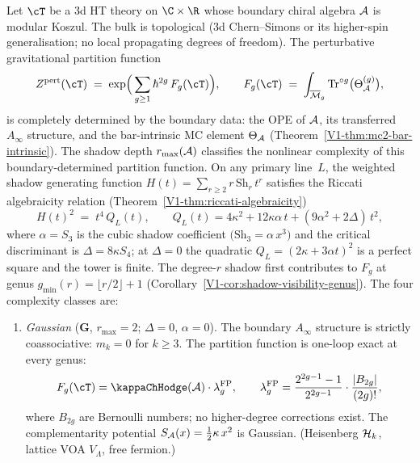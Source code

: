 \begin{theorem}
\label{thm:thqg-boundary-holographic-complexity}
\ClaimStatusProvedHere
{}
Let $\cT$ be a $3$d HT theory on $\C \times \R$ whose boundary
chiral algebra $\mathcal{A}$ is modular Koszul.
The bulk is topological \textup{(}$3$d Chern--Simons or its
higher-spin generalisation; no local propagating degrees of
freedom\textup{)}. The perturbative gravitational partition
function
\begin{equation}\label{eq:boundary-holographic-Z}
 Z^{\mathrm{pert}}(\cT)
 \;=\;
 \exp\Bigl(\,\sum_{g \geq 1} \hbar^{2g}\,F_g(\cT)\Bigr),
 \qquad
 F_g(\cT)
 \;=\;
 \int_{\overline{\cM}_g}
 \operatorname{Tr}^{\circ g}\bigl(\Theta_\cA^{(g)}\bigr),
\end{equation}
is completely determined by the boundary data: the OPE of
$\mathcal{A}$, its transferred $A_\infty$ structure, and the
bar-intrinsic MC element $\Theta_{\mathcal{A}}$
\textup{(}Theorem~\textup{\ref*{V1-thm:mc2-bar-intrinsic}}\textup{)}.
The shadow depth $r_{\max}(\mathcal{A})$ classifies the nonlinear
complexity of this boundary-determined partition function.
On any primary line~$L$, the weighted shadow generating function
$H(t) = \sum_{r \geq 2} r\,\mathrm{Sh}_r\,t^r$ satisfies
the Riccati algebraicity relation
\textup{(}Theorem~\textup{\ref*{V1-thm:riccati-algebraicity}}\textup{)}
\begin{equation}\label{eq:boundary-holographic-riccati}
 H(t)^2 \;=\; t^4\,Q_L(t),
 \qquad
 Q_L(t) = 4\kappa^2 + 12\kappa\alpha\,t
 + (9\alpha^2 + 2\Delta)\,t^2,
\end{equation}
where $\alpha = S_3$ is the cubic shadow coefficient
$\bigl(\mathrm{Sh}_3 = \alpha\,x^3\bigr)$ and the critical
discriminant is $\Delta = 8\kappa S_4$; at $\Delta = 0$ the
quadratic $Q_L = (2\kappa + 3\alpha t)^2$ is a perfect square and
the tower is finite.
The degree-$r$ shadow first contributes to $F_g$ at genus
$g_{\min}(r) = \lfloor r/2 \rfloor + 1$
\textup{(}Corollary~\textup{\ref{V1-cor:shadow-visibility-genus}}\textup{)}.
The four complexity classes are:
\begin{enumerate}[label=\textup{(\roman*)}]
\item \emph{Gaussian} ($\mathbf{G}$, $r_{\max} = 2$;
 $\Delta = 0$, $\alpha = 0$).
 The boundary $A_\infty$ structure is strictly
 coassociative: $m_k = 0$ for $k \geq 3$.
 The partition function is one-loop exact at every genus:
 \[
 F_g(\cT) = \kappaChHodge(\cA)\cdot\lambda_g^{\mathrm{FP}},
 \qquad
 \lambda_g^{\mathrm{FP}} =
 \frac{2^{2g-1}-1}{2^{2g-1}}\cdot
 \frac{|B_{2g}|}{(2g)!},
 \]
 where $B_{2g}$ are Bernoulli numbers; no higher-degree
 corrections exist. The complementarity potential
 $S_{\mathcal{A}}(x) = \tfrac{1}{2}\kappa\,x^2$ is Gaussian.
 \textup{(}Heisenberg $\mathcal{H}_k$, lattice VOA $V_\Lambda$,
 free fermion.\textup{)}


\end{enumerate}
\end{theorem}
